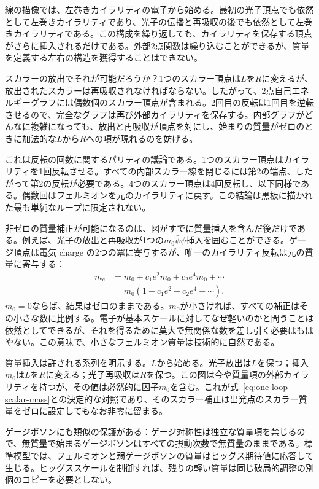 線の描像では、左巻きカイラリティの電子から始める。最初の光子頂点でも依然として左巻きカイラリティであり、光子の伝播と再吸収の後でも依然として左巻きカイラリティである。この構成を繰り返しても、カイラリティを保存する頂点がさらに挿入されるだけである。外部2点関数は繰り込むことができるが、質量を定義する左右の構造を獲得することはできない。

スカラーの放出でそれが可能だろうか？1つのスカラー頂点は\(L\)を\(R\)に変えるが、放出されたスカラーは再吸収されなければならない。したがって、2点自己エネルギーグラフには偶数個のスカラー頂点が含まれる。2回目の反転は1回目を逆転させるので、完全なグラフは再び外部カイラリティを保存する。内部グラフがどんなに複雑になっても、放出と再吸収が頂点を対にし、始まりの質量がゼロのときに加法的な\(L\)から\(R\)への項が現れるのを妨げる。

これは反転の回数に関するパリティの議論である。1つのスカラー頂点はカイラリティを1回反転させる。すべての内部スカラー線を閉じるには第2の端点、したがって第2の反転が必要である。4つのスカラー頂点は4回反転し、以下同様である。偶数回はフェルミオンを元のカイラリティに戻す。この結論は黒板に描かれた最も単純なループに限定されない。

非ゼロの質量補正が可能になるのは、図がすでに質量挿入を含んだ後だけである。例えば、光子の放出と再吸収が1つの\(m_0\bar\psi\psi\)挿入を囲むことができる。ゲージ頂点は電気 charge の2つの冪に寄与するが、唯一のカイラリティ反転は元の質量に寄与する：
\begin{equation}
\begin{aligned}
m_e
&=m_0+c_1e^2m_0+c_2e^4m_0+\cdots\\
&=m_0\left(1+c_1e^2+c_2e^4+\cdots\right).
\end{aligned}
\label{eq:multiplicative-fermion-mass}
\end{equation}
\(m_0=0\)ならば、結果はゼロのままである。\(m_0\)が小さければ、すべての補正はその小さな数に比例する。電子が基本スケールに対してなぜ軽いのかと問うことは依然としてできるが、それを得るために莫大で無関係な数を差し引く必要はもはやない。この意味で、小さなフェルミオン質量は技術的に自然である。

質量挿入は許される系列を明示する。\(L\)から始める。光子放出は\(L\)を保つ；挿入\(m_0\)は\(L\)を\(R\)に変える；光子再吸収は\(R\)を保つ。この図は今や質量項の外部カイラリティを持つが、その値は必然的に因子\(m_0\)を含む。これが式~\eqref{eq:one-loop-scalar-mass}との決定的な対照であり、そのスカラー補正は出発点のスカラー質量をゼロに設定してもなお非零に留まる。

ゲージボソンにも類似の保護がある：ゲージ対称性は独立な質量項を禁じるので、無質量で始まるゲージボソンはすべての摂動次数で無質量のままである。標準模型では、フェルミオンと弱ゲージボソンの質量はヒッグス期待値に応答して生じる。ヒッグススケールを制御すれば、残りの軽い質量は同じ破局的調整の別個のコピーを必要としない。

